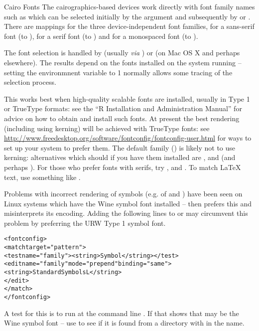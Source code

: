 \begin{Section}{Cairo Fonts}
The cairographics-based devices work directly with font family names
such as  which can be selected initially by the
 argument and subsequently by  or
.  There are mappings for the three
device-independent font families,  for a sans-serif font
(to ),  for a serif font (to
) and  for a monospaced font (to
).

The font selection is handled by  (usually \emph{via}
) or  (on Mac OS X and perhaps
elsewhere).  The results depend on the fonts installed on the system
running \R{} -- setting the environmnent variable  to 1
normally allows some tracing of the selection process.

This works best when high-quality scalable fonts are installed,
usually in Type 1 or TrueType formats: see the ``R Installation
and Administration Manual'' for advice on how to obtain and install
such fonts.  At present the best rendering (including using kerning)
will be achieved with TrueType fonts: see
\url{http://www.freedesktop.org/software/fontconfig/fontconfig-user.html}
for ways to set up your system to prefer them.  The default family
() is likely not to use kerning: alternatives which
should if you have them installed are ,
 and  (and perhaps
).  For those who prefer fonts with serifs, try
,  and .  To match LaTeX text, use something like .


Problems with incorrect rendering of symbols (e.g. of
 and )
have been seen on Linux systems which have the Wine
symbol font installed --  then prefers this and
misinterprets its encoding.  Adding the following lines
to  or  may circumvent
this problem by preferring the URW Type 1 symbol font.
\begin{alltt}<fontconfig>
<match target="pattern">
  <test name="family"><string>Symbol</string></test>
  <edit name="family" mode="prepend" binding="same">
    <string>Standard Symbols L</string>
  </edit>
</match>
</fontconfig>
\end{alltt}

A test for this is to run at the command line .
If that shows  that may be the Wine symbol font -- use
 to see if it is found from a directory with
 in the name.
\end{Section}
